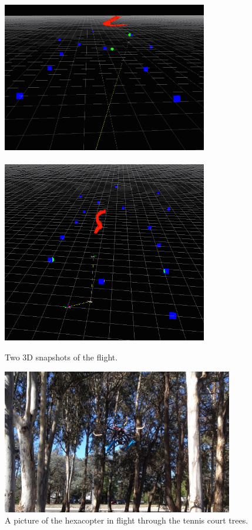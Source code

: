 \documentclass[12pt,oneside,a4paper,draft]{book}
\begin{document}
\begin{figure}
  \centering
  \includegraphics[width=0.8\textwidth]{figs/tennis-flying-1}\\~\\
  \includegraphics[width=0.8\textwidth]{figs/tennis-flying-2}
  \caption{Two 3D snapshots of the flight.}
  \label{fig:flying-tennis-3D}
\end{figure}

\begin{figure}
  \centering
  \includegraphics[width=0.9\textwidth]{figs/tennis-flying-pic}
  \caption{A picture of the hexacopter in flight through the tennis court trees.}
  \label{fig:flying-tennis-pic}
\end{figure}
\end{document}
